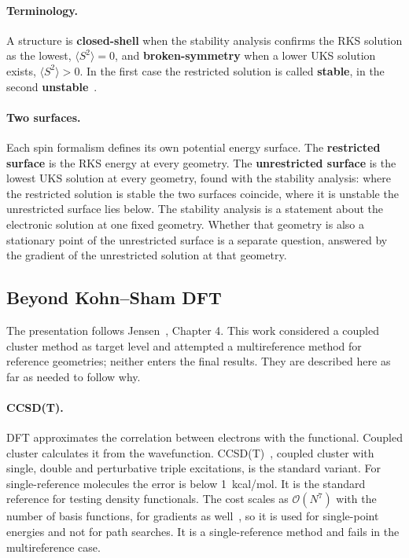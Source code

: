 \paragraph{Terminology.} A structure is \textbf{closed-shell} when the
stability analysis confirms the RKS solution as the lowest,
$\langle S^2 \rangle = 0$, and \textbf{broken-symmetry} when a lower UKS
solution exists, $\langle S^2 \rangle > 0$. In the first case the
restricted solution is called \textbf{stable}, in the second
\textbf{unstable}~\cite{seeger1977}.

\paragraph{Two surfaces.} Each spin formalism defines its own potential
energy surface. The \textbf{restricted surface} is the RKS energy at
every geometry. The \textbf{unrestricted surface} is the lowest UKS
solution at every geometry, found with the stability analysis: where
the restricted solution is stable the two surfaces coincide, where it
is unstable the unrestricted surface lies below. The stability analysis
is a statement about the electronic solution at one fixed geometry.
Whether that geometry is also a stationary point of the unrestricted
surface is a separate question, answered by the gradient of the
unrestricted solution at that geometry.

\subsection{Beyond Kohn--Sham DFT}
\label{sec:background-beyond}

The presentation follows Jensen~\cite{jensen2017}, Chapter 4. This work
considered a coupled cluster method as target level and attempted a
multireference method for reference geometries; neither enters the
final results. They are described here as far as needed to follow why.

\paragraph{CCSD(T).} DFT approximates the correlation between electrons
with the functional. Coupled cluster calculates it from the wavefunction.
\mbox{CCSD(T)}~\cite{raghavachari1989}, coupled cluster with single,
double and perturbative triple excitations, is the standard variant. For
single-reference molecules the error is below 1~kcal/mol. It is the
standard reference for testing density functionals. The cost scales as
$\mathcal{O}(N^7)$ with the number of basis functions, for gradients as
well~\cite{scuseria1991}, so it is used for single-point energies and not
for path searches. It is a single-reference method and fails in the
multireference case.

